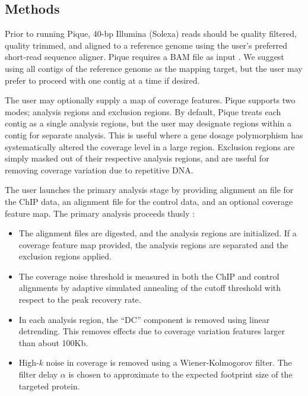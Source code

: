 \documentclass{bioinfo}
\begin{document}
\begin{methods}
\section{Methods}

\noindent Prior to running Pique, 40-bp Illumina (Solexa) reads should
be quality filtered, quality trimmed, and aligned to a reference
genome using the user's preferred short-read sequence aligner. Pique
requires a BAM file as input \cite{sam_format}. We suggest using all
contigs of the reference genome as the mapping target, but the user
may prefer to proceed with one contig at a time if desired. 

The user may optionally supply a map of coverage features. Pique
supports two modes; analysis regions and exclusion regions. By
default, Pique treats each contig as a single analysis regions, but
the user may designate regions within a contig for separate
analysis. This is useful where a gene dosage polymorphism has
systematically altered the coverage level in a large region. Exclusion
regions are simply masked out of their respective analysis regions,
and are useful for removing coverage variation due to repetitive DNA.

The user launches the primary analysis stage by providing alignment an
file for the ChIP data, an alignment file for the control data, and an
optional coverage feature map. The primary analysis proceeds thusly :

\begin{itemize}

\item The alignment files are digested, and the analysis regions are
  initialized. If a coverage feature map provided, the analysis
  regions are separated and the exclusion regions applied.

\item The coverage noise threshold is measured in both the ChIP and
  control alignments by adaptive simulated annealing of the cutoff
  threshold with respect to the peak recovery rate.

\item In each analysis region, the ``DC'' component is removed using
  linear detrending. This removes effects due to coverage variation
  features larger than about 100Kb.

\item High-$k$ noise in coverage is removed using a Wiener-Kolmogorov
  filter. The filter delay $\alpha$ is chosen to approximate to the
  expected footprint size of the targeted protein.


\end{itemize}
\end{methods}
\end{document}

